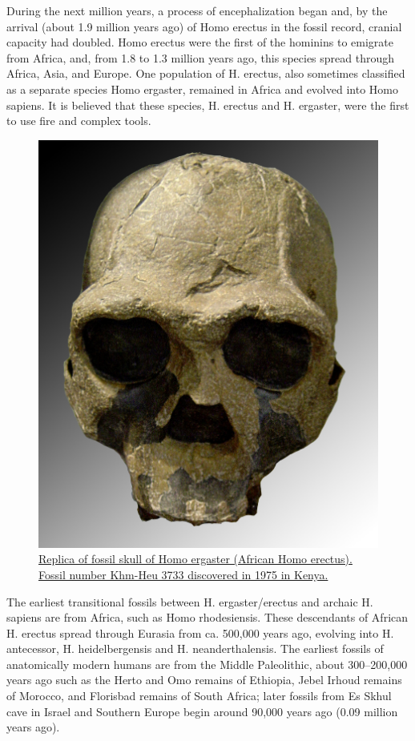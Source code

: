 During the next million years, a process of encephalization began and, by the arrival (about 1.9 million years ago) of Homo erectus in the fossil record, cranial capacity had doubled. Homo erectus were the first of the hominins to emigrate from Africa, and, from 1.8 to 1.3 million years ago, this species spread through Africa, Asia, and Europe. One population of H. erectus, also sometimes classified as a separate species Homo ergaster, remained in Africa and evolved into Homo sapiens. It is believed that these species, H. erectus and H. ergaster, were the first to use fire and complex tools.



\begin{figure}

{\centering \includegraphics[width=0.7\linewidth]{./figures/animals/Homo_ergaster} 

}

\caption{\href{https://commons.wikimedia.org/wiki/File:Homo_ergaster.jpg}{Replica of fossil skull of Homo ergaster (African Homo erectus). Fossil number Khm-Heu 3733 discovered in 1975 in Kenya.}}\label{fig:homoergaster}
\end{figure}

The earliest transitional fossils between H. ergaster/erectus and archaic H. sapiens are from Africa, such as Homo rhodesiensis. These descendants of African H. erectus spread through Eurasia from ca. 500,000 years ago, evolving into H. antecessor, H. heidelbergensis and H. neanderthalensis. The earliest fossils of anatomically modern humans are from the Middle Paleolithic, about 300--200,000 years ago such as the Herto and Omo remains of Ethiopia, Jebel Irhoud remains of Morocco, and Florisbad remains of South Africa; later fossils from Es Skhul cave in Israel and Southern Europe begin around 90,000 years ago (0.09 million years ago).

